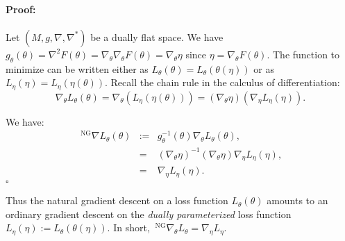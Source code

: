 \documentclass[11pt]{article}
\newenvironment{proof}{\paragraph{Proof:}}{\hfill$\square$}
\def\leftsup#1{\ ^{#1}}
\def\NG{\mathrm{NG}}
\def\nablaNG{\leftsup{\NG}\nabla}
\def\eqdef{:=}
\begin{document}
\begin{proof}
Let $(M,g,\nabla,\nabla^*)$ be a dually flat space. We have $g_\theta(\theta)=\nabla^2 F(\theta)=\nabla_\theta \nabla_\theta F(\theta)=\nabla_\theta\eta$ since $\eta=\nabla_\theta F(\theta)$.
The function to minimize can be written either as $L_\theta(\theta)=L_\theta(\theta(\eta))$ or as $L_\eta(\eta)=L_\eta(\eta(\theta))$.
Recall the chain rule in the calculus of differentiation:
\begin{equation}
\nabla_\theta L_\theta(\theta)= \nabla_\theta (L_\eta(\eta(\theta)))=
 (\nabla_\theta\eta) (\nabla_\eta L_{\eta}(\eta)).
\end{equation}

We have:
\begin{eqnarray}
\nablaNG L_\theta(\theta) &\eqdef& g_\theta^{-1}(\theta) \nabla_\theta L_\theta(\theta),\\
&=& (\nabla_\theta \eta)^{-1} (\nabla_\theta\eta) \nabla_\eta L_{\eta}(\eta),\\
&=& \nabla_\eta L_\eta(\eta).
\end{eqnarray}
\end{proof}

Thus the natural gradient descent on a loss function $L_\theta(\theta)$ amounts to an ordinary gradient descent on the {\em dually parameterized} loss function $L_\eta(\eta):=L_\theta(\theta(\eta))$.
In short, $\nablaNG_\theta L_\theta=\nabla_\eta L_\eta$.



\end{document}
